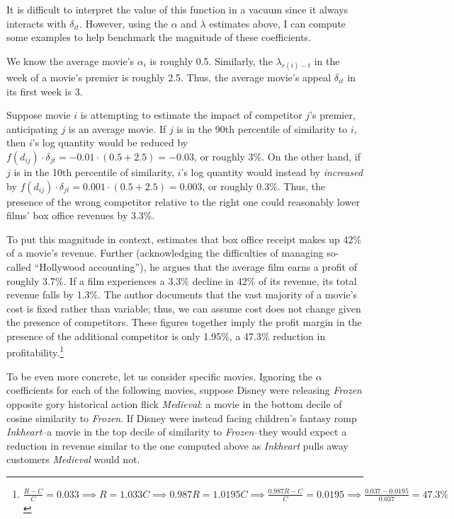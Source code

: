 \documentclass{article}
\begin{document}
It is difficult to interpret the value of this function in a vacuum since it always interacts with $\delta_{it}$. However, using the $\alpha$ and $\lambda$ estimates above, I can compute some examples to help benchmark the magnitude of these coefficients.

We know the average movie's $\alpha_i$ is roughly 0.5. Similarly, the $\lambda_{r(i) - t}$ in the week of a movie's premier is roughly 2.5. Thus, the average movie's appeal $\delta_{it}$ in its first week is 3. 

Suppose movie $i$ is attempting to estimate the impact of competitor $j$'s premier, anticipating $j$ is an average movie. If $j$ is in the 90th percentile of similarity to $i$, then $i$'s log quantity would be reduced by $f(d_{ij}) \cdot \delta_{jt} = -0.01 \cdot (0.5 + 2.5) = -0.03$, or roughly 3\%. On the other hand, if $j$ is in the 10th percentile of similarity, $i$'s log quantity would instead by \emph{increased} by $f(d_{ij}) \cdot \delta_{jt} = 0.001 \cdot (0.5 + 2.5) = 0.003$, or roughly 0.3\%. Thus, the presence of the wrong competitor relative to the right one could reasonably lower films' box office revenues by 3.3\%.

To put this magnitude in context, \textcite{follows2016SF} estimates that box office receipt makes up 42\% of a movie's revenue. Further (acknowledging the difficulties of managing so-called ``Hollywood accounting''), he argues that the average film earns a profit of roughly 3.7\%. If a film experiences a 3.3\% decline in 42\% of its revenue, its total revenue falls by 1.3\%. The author documents that the vast majority of a movie's cost is fixed rather than variable; thus, we can assume cost does not change given the presence of competitors. These figures together imply the profit margin in the presence of the additional competitor is only 1.95\%, a 47.3\% reduction in profitability.\footnote{$\frac{R - C}{C} = 0.033 \implies R = 1.033C \implies 0.987 R = 1.0195 C \implies \frac{0.987R - C}{C} = 0.0195 \implies \frac{0.037 - 0.0195}{0.037} = 47.3\%$} 

To be even more concrete, let us consider specific movies. Ignoring the $\alpha$ coefficients for each of the following movies, suppose Disney were releasing \emph{Frozen} opposite gory historical action flick \emph{Medieval}: a movie in the bottom decile of cosine similarity to \emph{Frozen}. If Disney were instead facing children's fantasy romp \emph{Inkheart}--a movie in the top decile of similarity to \emph{Frozen}--they would expect a reduction in revenue similar to the one computed above as \emph{Inkheart} pulls away customers \emph{Medieval} would not. 
\end{document}
